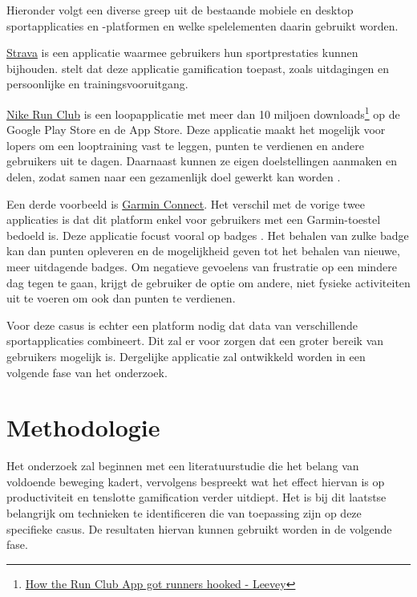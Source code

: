 Hieronder volgt een diverse greep uit de bestaande mobiele en desktop sportapplicaties en -platformen en welke spelelementen daarin gebruikt worden.

\href{https://www.strava.com/}{Strava} is een applicatie waarmee gebruikers hun sportprestaties kunnen bijhouden. \textcite{Barratt2017} stelt dat deze applicatie gamification toepast, zoals uitdagingen en persoonlijke en trainingsvooruitgang.

\href{https://www.nike.com/be/en/nrc-app}{Nike Run Club} is een loopapplicatie met meer dan 10 miljoen downloads\footnote{\href{https://bootcamp.uxdesign.cc/how-the-nike-run-club-app-got-runners-hooked-2850c7654fc5}{How the Run Club App got runners hooked - Leevey}} op de Google Play Store en de App Store. Deze applicatie maakt het mogelijk voor lopers om een looptraining vast te leggen, punten te verdienen en andere gebruikers uit te dagen. Daarnaast kunnen ze eigen doelstellingen aanmaken en delen, zodat samen naar een gezamenlijk doel gewerkt kan worden \autocite{StaalnackeLarsson2013}.

Een derde voorbeeld is \href{https://connect.garmin.com/}{Garmin Connect}. Het verschil met de vorige twee applicaties is dat dit platform enkel voor gebruikers met een Garmin-toestel bedoeld is. Deze applicatie focust vooral op badges \autocite{Ilhan2019}. Het behalen van zulke badge kan dan punten opleveren en de mogelijkheid geven tot het behalen van nieuwe, meer uitdagende badges. Om negatieve gevoelens van frustratie op een mindere dag tegen te gaan, krijgt de gebruiker de optie om andere, niet fysieke activiteiten uit te voeren om ook dan punten te verdienen.

Voor deze casus is echter een platform nodig dat data van verschillende sportapplicaties combineert. Dit zal er voor zorgen dat een groter bereik van gebruikers mogelijk is. Dergelijke applicatie zal ontwikkeld worden in een volgende fase van het onderzoek.


\section{Methodologie}
\label{sec:methodologie}

Het onderzoek zal beginnen met een literatuurstudie die het belang van voldoende beweging kadert, vervolgens bespreekt wat het effect hiervan is op productiviteit en tenslotte gamification verder uitdiept. Het is bij dit laatstse belangrijk om technieken te identificeren die van toepassing zijn op deze specifieke casus. De resultaten hiervan kunnen gebruikt worden in de volgende fase.

